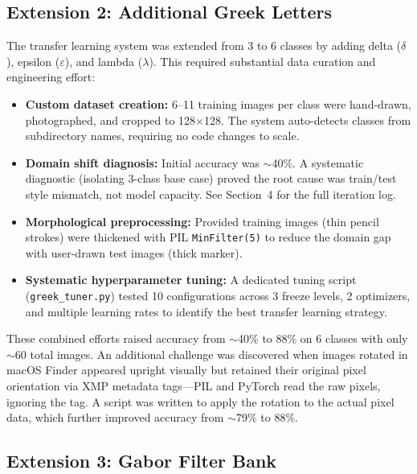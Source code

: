 \documentclass[11pt]{article}
\begin{document}
\subsection{Extension 2: Additional Greek Letters}

The transfer learning system was extended from 3 to 6 classes by adding
delta ($\delta$), epsilon ($\varepsilon$), and lambda ($\lambda$).
This required substantial data curation and engineering effort:

\begin{itemize}
    \item \textbf{Custom dataset creation:} 6--11 training images per
    class were hand-drawn, photographed, and cropped to
    128$\times$128. The system auto-detects classes from subdirectory
    names, requiring no code changes to scale.

    \item \textbf{Domain shift diagnosis:} Initial accuracy was
    $\sim$40\%. A systematic diagnostic (isolating 3-class base case)
    proved the root cause was train/test style mismatch, not model
    capacity. See Section~4 for the full iteration log.

    \item \textbf{Morphological preprocessing:} Provided training
    images (thin pencil strokes) were thickened with PIL
    \texttt{MinFilter(5)} to reduce the domain gap with user-drawn
    test images (thick marker).

    \item \textbf{Systematic hyperparameter tuning:} A dedicated
    tuning script (\texttt{greek\_tuner.py}) tested 10 configurations
    across 3 freeze levels, 2 optimizers, and multiple learning rates
    to identify the best transfer learning strategy.
\end{itemize}

These combined efforts raised accuracy from $\sim$40\% to 88\%
on 6 classes with only $\sim$60 total images. An additional challenge
was discovered when images rotated in macOS Finder appeared upright
visually but retained their original pixel orientation via XMP metadata
tags---PIL and PyTorch read the raw pixels, ignoring the tag. A script
was written to apply the rotation to the actual pixel data, which
further improved accuracy from $\sim$79\% to 88\%.

\subsection{Extension 3: Gabor Filter Bank}
\end{document}
